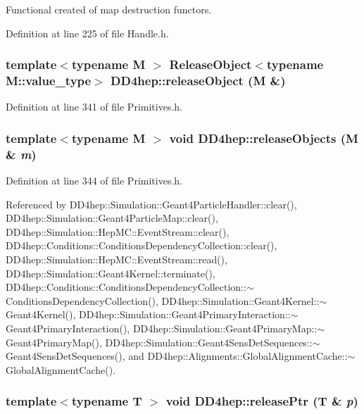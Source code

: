 Functional created of map destruction functors. 

Definition at line 225 of file Handle.h.\hypertarget{namespace_d_d4hep_a83f518b3da47a2f0c4a65b48ed459578}{
\subsubsection[{releaseObject}]{\setlength{\rightskip}{0pt plus 5cm}template$<$typename M $>$ {\bf ReleaseObject}$<$typename M::value\_\-type$>$ DD4hep::releaseObject (M \&)}}
\label{namespace_d_d4hep_a83f518b3da47a2f0c4a65b48ed459578}


Definition at line 341 of file Primitives.h.\hypertarget{namespace_d_d4hep_a069d5802981cb52e1e4981aabd8157e2}{
\subsubsection[{releaseObjects}]{\setlength{\rightskip}{0pt plus 5cm}template$<$typename M $>$ void DD4hep::releaseObjects (M \& {\em m})}}
\label{namespace_d_d4hep_a069d5802981cb52e1e4981aabd8157e2}


Definition at line 344 of file Primitives.h.

Referenced by DD4hep::Simulation::Geant4ParticleHandler::clear(), DD4hep::Simulation::Geant4ParticleMap::clear(), DD4hep::Simulation::HepMC::EventStream::clear(), DD4hep::Conditions::ConditionsDependencyCollection::clear(), DD4hep::Simulation::HepMC::EventStream::read(), DD4hep::Simulation::Geant4Kernel::terminate(), DD4hep::Conditions::ConditionsDependencyCollection::$\sim$ConditionsDependencyCollection(), DD4hep::Simulation::Geant4Kernel::$\sim$Geant4Kernel(), DD4hep::Simulation::Geant4PrimaryInteraction::$\sim$Geant4PrimaryInteraction(), DD4hep::Simulation::Geant4PrimaryMap::$\sim$Geant4PrimaryMap(), DD4hep::Simulation::Geant4SensDetSequences::$\sim$Geant4SensDetSequences(), and DD4hep::Alignments::GlobalAlignmentCache::$\sim$GlobalAlignmentCache().\hypertarget{namespace_d_d4hep_a330e1e3e191c07da4ffcb6e698f28cda}{
\subsubsection[{releasePtr}]{\setlength{\rightskip}{0pt plus 5cm}template$<$typename T $>$ void DD4hep::releasePtr ({\bf T} \& {\em p})}}
\label{namespace_d_d4hep_a330e1e3e191c07da4ffcb6e698f28cda}


